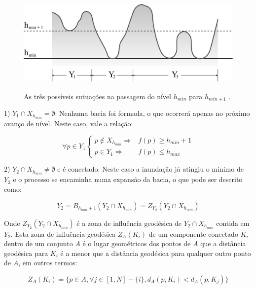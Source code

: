 \begin{figure}[H]
  \begin{center}
    \includegraphics[height=5cm]{imagens/niveis.pdf}
  \end{center}
  \caption{ As três possíveis sutuações na passagem do nível $ h_{min} $ para
    $ h_{min + 1} $ . }
  \label{fig:niveis}
\end{figure}

1) $ Y_1 \cap X_{h_{min}} = \emptyset $: Nenhuma bacia foi formada, o que ocorrerá
apenas no próximo avanço de nível. Neste caso, vale a relação:

\begin{equation}\label{eq:watershed_caso1}
  \forall p \in Y_1 \left\{
    \begin{array}{rc}
      p \notin X_{h_{min}} \Rightarrow & f(p) \ge h_{min} + 1 \\
                 p \in Y_1 \Rightarrow & f(p) \le h_{max}
    \end{array}
  \right.
\end{equation}

2) $ Y_2 \cap X_{h_{min}} \neq \emptyset $ e é conectado: Neste caso a inundação já atingiu o
mínimo de $ Y_2 $ e o processo se encaminha numa expansão da bacia, o que pode
ser descrito como:

\begin{equation}\label{eq:watershed_caso21}
  Y_2 = B_{h_{min} + 1}(Y_2 \cap X_{h_{min}}) = Z_{Y_2}(Y_2 \cap X_{h_{min}})
\end{equation}

Onde $ Z_{Y_2}(Y_2 \cap X_{h_{min}}) $ é a zona de influência geodésica de
$ Y_2 \cap X_{h_{min}} $ contida em $ Y_2 $. Esta zona de influência
geodésica $ Z_A(K_i) $ de um componente conectado $ K_i $ dentro de um conjunto $ A $
é o lugar geométricos dos pontos
de $ A $ que a distância geodésica para $ K_i $ é a menor que a distância
geodésica para qualquer outro ponto de $ A $, em outros termos:

\begin{equation}\label{eq:watershed_caso22}
  Z_A(K_i) = \{ p \in A, \forall j \in [1, N] - \{ i \}, d_A(p, K_i) < d_A(p, K_j) \}
\end{equation}

